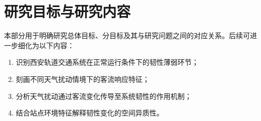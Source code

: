 \section{研究目标与研究内容}

本部分用于明确研究总体目标、分目标及其与研究问题之间的对应关系。后续可进一步细化为以下内容：

\begin{enumerate}
\item 识别西安轨道交通系统在正常运行条件下的韧性薄弱环节；
\item 刻画不同天气扰动情境下的客流响应特征；
\item 分析天气扰动通过客流变化传导至系统韧性的作用机制；
\item 结合站点环境特征解释韧性变化的空间异质性。
\end{enumerate}
